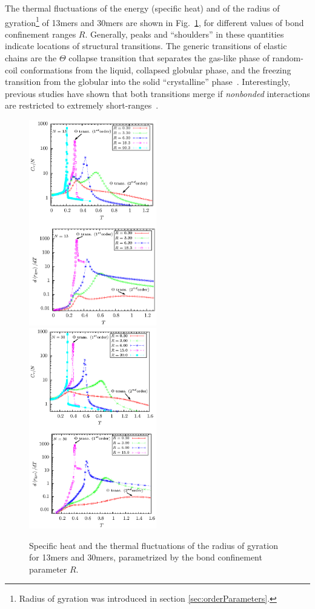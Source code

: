 \documentclass[12pt]{report}
\begin{document}
The thermal fluctuations of the energy (specific heat) and of the radius of gyration\footnote{Radius of gyration was introduced in section\,\,\ref{sec:orderParameters}.} of 13mers and 30mers are shown in Fig.~\ref{fig:ElasPolyCanonicalResults}, for different values of bond confinement ranges $R$. Generally, peaks and ``shoulders'' in these quantities indicate locations of structural transitions. The generic transitions of elastic chains are the $\Theta$ collapse transition that separates the gas-like phase of random-coil conformations from the liquid, collapsed globular phase, and the freezing transition from the globular into the solid ``crystalline'' phase~\cite{svbj1,Schnabel2009}. Interestingly, previous studies have shown that both transitions merge if \emph{nonbonded} interactions are restricted to extremely short-ranges~\cite{taylorRange1,taylorRange2,Gross2013}. 
%
\begin{figure}
\center
\includegraphics[width = 0.496\textwidth]{chapter5Figs/canon13.eps}
\includegraphics[width = 0.496\textwidth]{chapter5Figs/canon30.eps}
\caption{\label{fig:ElasPolyCanonicalResults}%
Specific heat and the thermal fluctuations of the radius of gyration for 13mers and 30mers, parametrized by the bond confinement parameter $R$.}
\end{figure} 
\end{document}
